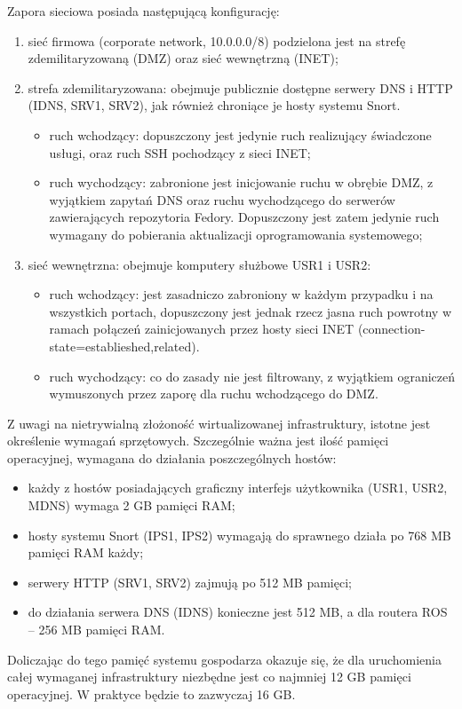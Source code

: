 \documentclass{eiti-raport}
\begin{document}
Zapora sieciowa posiada następującą konfigurację:
\begin{enumerate}
	\item sieć firmowa (corporate network, 10.0.0.0/8) podzielona jest na strefę zdemilitaryzowaną (DMZ) oraz sieć wewnętrzną (INET);
	\item strefa zdemilitaryzowana: obejmuje publicznie dostępne serwery DNS i HTTP (IDNS, SRV1, SRV2), jak również chroniące je hosty systemu Snort.
	\begin{itemize}
		\item ruch wchodzący: dopuszczony jest jedynie ruch realizujący świadczone usługi, oraz ruch SSH pochodzący z sieci INET;
		\item ruch wychodzący: zabronione jest inicjowanie ruchu w obrębie DMZ, z wyjątkiem zapytań DNS oraz ruchu wychodzącego do serwerów zawierających repozytoria Fedory. Dopuszczony jest zatem jedynie ruch wymagany do pobierania aktualizacji oprogramowania systemowego;
	\end{itemize}
	\item sieć wewnętrzna: obejmuje komputery służbowe USR1 i USR2:
	\begin{itemize}
		\item ruch wchodzący: jest zasadniczo zabroniony w każdym przypadku i na wszystkich portach, dopuszczony jest jednak rzecz jasna ruch powrotny w ramach połączeń zainicjowanych przez hosty sieci INET (connection-state=establieshed,related).
		\item ruch wychodzący: co do zasady nie jest filtrowany, z wyjątkiem ograniczeń wymuszonych przez zaporę dla ruchu wchodzącego do DMZ.
	\end{itemize}
\end{enumerate}
Z uwagi na nietrywialną złożoność wirtualizowanej infrastruktury, istotne jest określenie wymagań sprzętowych. Szczególnie ważna jest ilość pamięci operacyjnej, wymagana do działania poszczególnych hostów:
\begin{itemize}
	\item każdy z hostów posiadających graficzny interfejs użytkownika (USR1, USR2, MDNS) wymaga 2 GB pamięci RAM;
	\item hosty systemu Snort (IPS1, IPS2) wymagają do sprawnego działa po 768 MB pamięci RAM każdy;
	\item serwery HTTP (SRV1, SRV2) zajmują po 512 MB pamięci;
	\item do działania serwera DNS (IDNS) konieczne jest 512 MB, a dla routera ROS -- 256 MB pamięci RAM.
\end{itemize}
Doliczając do tego pamięć systemu gospodarza okazuje się, że dla uruchomienia całej wymaganej infrastruktury niezbędne jest co najmniej 12 GB pamięci operacyjnej. W praktyce będzie to zazwyczaj 16 GB. 
\end{document}
